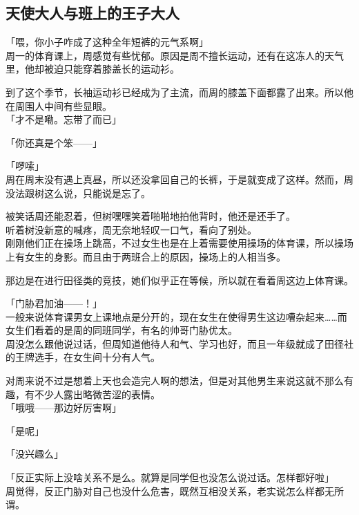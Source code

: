 \subsection{天使大人与班上的王子大人}

「喂，你小子咋成了这种全年短裤的元气系啊」\\

周一的体育课上，周感觉有些忧郁。原因是周不擅长运动，还有在这冻人的天气里，他却被迫只能穿着膝盖长的运动衫。

到了这个季节，长袖运动衫已经成为了主流，而周的膝盖下面都露了出来。所以他在周围人中间有些显眼。\\

「才不是嘞。忘带了而已」

「你还真是个笨——」

「啰嗦」\\

周在周末没有遇上真昼，所以还没拿回自己的长裤，于是就变成了这样。然而，周没法跟树这么说，只能说是忘了。

被笑话周还能忍着，但树嘿嘿笑着啪啪地拍他背时，他还是还手了。\\

听着树没新意的喊疼，周无奈地轻叹一口气，看向了别处。\\

刚刚他们正在操场上跳高，不过女生也是在上着需要使用操场的体育课，所以操场上有女生的身影。而且由于两班合上的原因，操场上的人相当多。

那边是在进行田径类的竞技，她们似乎正在等候，所以就在看着周这边上体育课。

「门胁君加油——！」\\

一般来说体育课男女上课地点是分开的，现在女生在使得男生这边嘈杂起来……而女生们看着的是周的同班同学，有名的帅哥门胁优太。\\

周没怎么跟他说过话，但周知道他待人和气、学习也好，而且一年级就成了田径社的王牌选手，在女生间十分有人气。

对周来说不过是想着上天也会造完人啊的想法，但是对其他男生来说这就不那么有趣，有不少人露出略微苦涩的表情。\\

「哦哦——那边好厉害啊」

「是呢」

「没兴趣么」

「反正实际上没啥关系不是么。就算是同学但也没怎么说过话。怎样都好啦」\\

周觉得，反正门胁对自己也没什么危害，既然互相没关系，老实说怎么样都无所谓。\\

